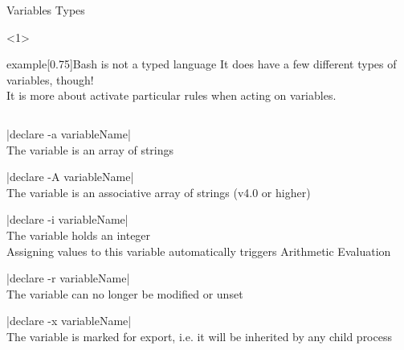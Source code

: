\begin{frame}[fragile]{Variables Types}
    \begin{onlyenv}<1>
        \vspace{-5mm}
        \begin{varblock}{example}[0.75\textwidth]{Bash is not a typed language}
            It does have a few different types of variables, though! \\
            It is more about activate particular rules when acting on variables.
        \end{varblock}
        \vspace{-5mm}
        \begin{columns}
            \begin{column}{\dimexpr\paperwidth-10mm}
                \begin{description}
                    \setlength{\itemsep}{1mm}
                    \item[\textbf{Array:}]
                        \bash|declare -a variableName|\\
                        The variable is an array of strings
                    \item[\textbf{Associative array:}]
                        \bash|declare -A variableName|\\
                        The variable is an associative array of strings (v4.0 or higher)
                    \item[\textbf{Integer:}]
                        \bash|declare -i variableName|\\
                        The variable holds an integer\\
                        Assigning values to this variable automatically triggers Arithmetic Evaluation
                    \item[\textbf{Read only:}]
                        \bash|declare -r variableName|\\
                        The variable can no longer be modified or unset
                    \item[\textbf{Export:}]
                        \bash|declare -x variableName|\\
                        The variable is marked for export, i.e. it will be inherited by any child process
                \end{description}
            \end{column}
        \end{columns}
    \end{onlyenv}

\end{frame}
